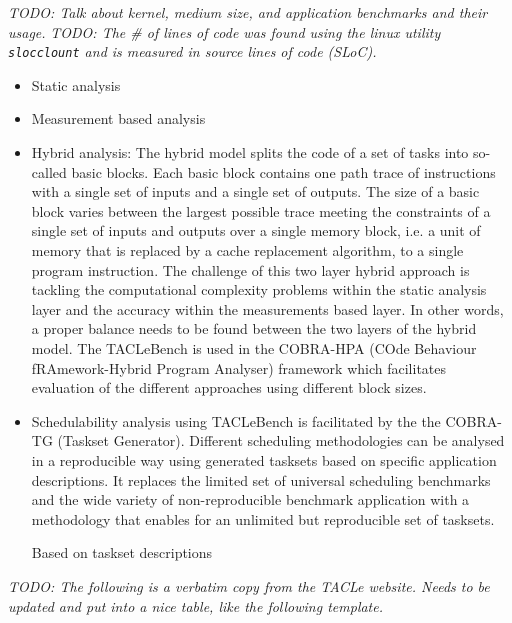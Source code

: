 \documentclass[a4paper,UKenglish]{oasics}
\newcommand{\todo}[1]{{\emph{TODO: #1}}}
\newcommand{\code}[1]{{\small{\texttt{#1}}}}
\begin{document}
\todo{Talk about kernel, medium size, and application benchmarks and their usage.}
\todo{The \# of lines of code was found using the linux utility \code{slocclount} and is measured in source lines of code (SLoC).}
\begin{itemize}
\item Static analysis
\item Measurement based analysis
\item Hybrid analysis: The hybrid model splits the code of a set of tasks into so-
called basic blocks. Each basic block contains one path trace of instructions with a single set of inputs and a single set of outputs.  The  size  of  a  basic  block  varies  between  the  largest possible trace meeting the constraints of a single set of inputs and outputs over a single memory block, i.e. a unit of memory that is replaced by a cache replacement algorithm, to a single program instruction.
The  challenge  of  this  two  layer  hybrid  approach  is  tackling the computational complexity problems within the static analysis  layer  and  the  accuracy  within  the  measurements based  layer.  In  other  words,  a  proper  balance  needs  to  be found between the two layers of the hybrid model. The TACLeBench is used in the COBRA-HPA (COde Behaviour fRAmework-Hybrid Program Analyser) framework which facilitates evaluation of the different approaches using different block sizes.
\item Schedulability analysis using TACLeBench is facilitated by the the COBRA-TG (Taskset Generator). Different scheduling methodologies can be analysed in a reproducible way using generated tasksets based on specific application descriptions. It replaces the limited set of universal scheduling benchmarks and the wide variety of non-reproducible benchmark application with a methodology that enables for an unlimited but reproducible set of tasksets.

Based on taskset descriptions
\end{itemize}

\todo{The following is a verbatim copy from the TACLe website.
Needs to be updated and put into a nice table, like the following template.}
\end{document}
